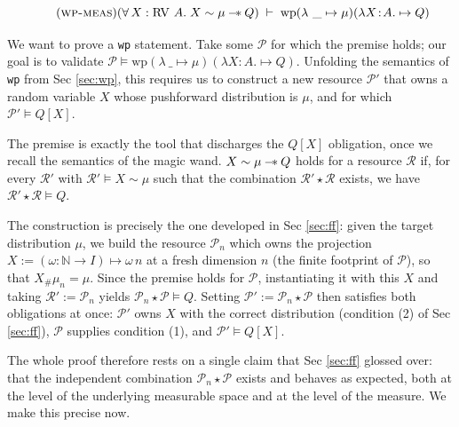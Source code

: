 \[
\tag{\textsc{wp-meas}}
(\forall\, X : \RV A.\; X \sim \mu \wand Q)
\;\vdash\;
\mathrm{wp} (\lambda\ \_ \mapsto \mu) ( \lambda X\!:\!A.\mapsto Q)
\]

We want to prove a \texttt{wp} statement. Take some $\mathcal{P}$ for which the premise holds; our goal is to validate
$\mathcal{P} \vDash \mathrm{wp} (\lambda\ \_ \mapsto \mu) ( \lambda X\!:\!A.\mapsto Q)$. Unfolding the semantics of \texttt{wp} from Sec \ref{sec:wp}, this
requires us to construct a new resource $\mathcal{P'}$ that owns a random variable $X$ whose pushforward distribution is $\mu$, and for which
$\mathcal{P'} \vDash Q[X]$.

The premise is exactly the tool that discharges the $Q[X]$ obligation, once we recall the semantics of the magic wand. $X \sim \mu \mathbin{-\!*} Q$ holds for a
resource $\mathcal{R}$ if, for every $\mathcal{R}'$ with $\mathcal{R}' \vDash X \sim \mu$ such that the combination $\mathcal{R}' \star \mathcal{R}$ exists, we
have $\mathcal{R}' \star \mathcal{R} \vDash Q$.

The construction is precisely the one developed in Sec \ref{sec:ff}: given the target distribution $\mu$, we build the resource $\mathcal{P}_n$ which owns the
projection $X := (\omega : \mathbb{N} \to I) \mapsto \omega\, n$ at a fresh dimension $n$ (the finite footprint of $\mathcal{P}$), so that $X_\#\mu_n = \mu$.
Since the premise holds for $\mathcal{P}$, instantiating it with this $X$ and taking $\mathcal{R}' := \mathcal{P}_n$ yields $\mathcal{P}_n \star \mathcal{P} \vDash Q$.
Setting $\mathcal{P'} := \mathcal{P}_n \star \mathcal{P}$ then satisfies both obligations at once: $\mathcal{P'}$ owns $X$ with the correct distribution
(condition (2) of Sec \ref{sec:ff}), $\mathcal{P}$ supplies condition (1), and $\mathcal{P'} \vDash Q[X]$.

The whole proof therefore rests on a single claim that Sec \ref{sec:ff} glossed over: that the independent combination $\mathcal{P}_n \star \mathcal{P}$ exists
and behaves as expected, both at the level of the underlying measurable space and at the level of the measure. We make this precise now.

